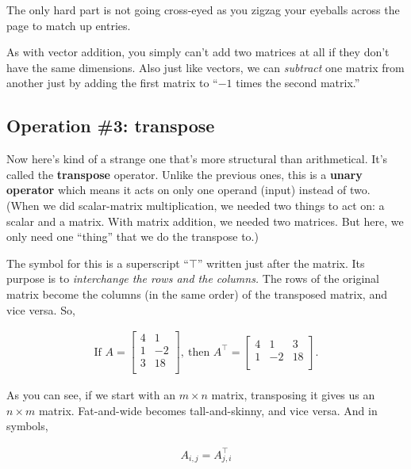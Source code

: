 The only hard part is not going cross-eyed as you zigzag your eyeballs across
the page to match up entries.

As with vector addition, you simply can't add two matrices at all if they don't
have the same dimensions. Also just like vectors, we can \textit{subtract} one
matrix from another just by adding the first matrix to ``$-1$ times the second
matrix.''

\subsection*{Operation \#3: transpose}

\label{transpose}

Now here's kind of a strange one that's more structural than arithmetical. It's
called the \textbf{transpose} operator. Unlike the previous ones, this is a
\textbf{unary operator} which means it acts on only one operand (input) instead
of two. (When we did scalar-matrix multiplication, we needed two things to act
on: a scalar and a matrix. With matrix addition, we needed two matrices. But
here, we only need one ``thing'' that we do the transpose to.)

The symbol for this is a superscript ``$\intercal$'' written just after the
matrix. Its purpose is to \textit{interchange the rows and the columns.} The
rows of the original matrix become the columns (in the same order) of the
transposed matrix, and vice versa. So,

\vspace{-.15in}
\begin{align*}
\textrm{If } A = 
\begin{bmatrix}
4 & 1 \\
1 & -2 \\
3 & 18 \\
\end{bmatrix},
\ \textrm{then } A^\intercal = 
\begin{bmatrix}
4 & 1 & 3 \\
1 & -2 & 18 \\
\end{bmatrix}.
\end{align*}

As you can see, if we start with an $m\times n$ matrix, transposing it gives us
an $n\times m$ matrix. Fat-and-wide becomes tall-and-skinny, and vice versa.
And in symbols,

\vspace{-.25in}
\begin{align*}
A_{i,j} = A^\intercal_{j,i}
\end{align*}
\vspace{-.25in}

